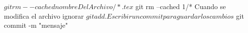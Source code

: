 $ git rm --cached nombreDelArchivo/*.tex
$ git rm --cached 1/*
Cuando se modifica el archivo ignorar
$ git add . 
Escribir un commit para guardar los cambios
$ git commit -m "mensaje"